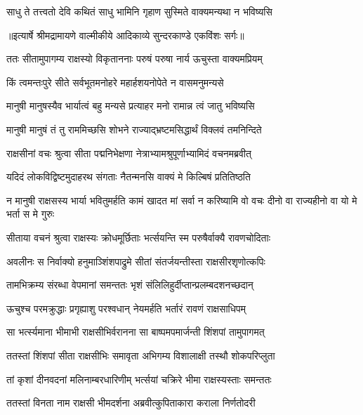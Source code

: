 \twolineshloka
{साधु ते तत्त्वतो देवि कथितं साधु भामिनि}
{गृहाण सुस्मिते वाक्यमन्यथा न भविष्यसि} %


{॥इत्यार्षे श्रीमद्रामायणे वाल्मीकीये आदिकाव्ये सुन्दरकाण्डे एकविंशः सर्गः॥}


\twolineshloka
{ततः सीतामुपागम्य राक्षस्यो विकृताननाः}
{परुषं परुषा नार्य ऊचुस्ता वाक्यमप्रियम्} %

\twolineshloka
{किं त्वमन्तःपुरे सीते सर्वभूतमनोहरे}
{महार्हशयनोपेते न वासमनुमन्यसे} %

\twolineshloka
{मानुषी मानुषस्यैव भार्यात्वं बहु मन्यसे}
{प्रत्याहर मनो रामान्न त्वं जातु भविष्यसि} %

\twolineshloka
{मानुषी मानुषं तं तु राममिच्छसि शोभने}
{राज्याद्भ्रष्टमसिद्धार्थं विक्लवं तमनिन्दिते} %

\twolineshloka
{राक्षसीनां वचः श्रुत्वा सीता पद्मनिभेक्षणा}
{नेत्राभ्यामश्रुपूर्णाभ्यामिदं वचनमब्रवीत्} %

\twolineshloka
{यदिदं लोकविद्विष्टमुदाहरथ संगताः}
{नैतन्मनसि वाक्यं मे किल्बिषं प्रतितिष्ठति} %

\threelineshloka
{न मानुषी राक्षसस्य भार्या भवितुमर्हति}
{कामं खादत मां सर्वा न करिष्यामि वो वचः}
{दीनो वा राज्यहीनो वा यो मे भर्ता स मे गुरुः} %

\twolineshloka
{सीताया वचनं श्रुत्वा राक्षस्यः क्रोधमूर्छिताः}
{भर्त्सयन्ति स्म परुषैर्वाक्यै रावणचोदिताः} %

\twolineshloka
{अवलीनः स निर्वाक्यो हनुमाञ्शिंशपाद्रुमे}
{सीतां संतर्जयन्तीस्ता राक्षसीरशृणोत्कपिः} %

\twolineshloka
{तामभिक्रम्य संरब्धा वेपमानां समन्ततः}
{भृशं संलिलिहुर्दीप्तान्प्रलम्बदशनच्छदान्} %

\twolineshloka
{ऊचुश्च परमक्रुद्धाः प्रगृह्याशु परश्वधान्}
{नेयमर्हति भर्तारं रावणं राक्षसाधिपम्} %

\twolineshloka
{सा भर्त्स्यमाना भीमाभी राक्षसीभिर्वरानना}
{सा बाष्पमपमार्जन्ती शिंशपां तामुपागमत्} %

\twolineshloka
{ततस्तां शिंशपां सीता राक्षसीभिः समावृता}
{अभिगम्य विशालाक्षी तस्थौ शोकपरिप्लुता} %

\twolineshloka
{तां कृशां दीनवदनां मलिनाम्बरधारिणीम्}
{भर्त्सयां चक्रिरे भीमा राक्षस्यस्ताः समन्ततः} %

\twolineshloka
{ततस्तां विनता नाम राक्षसी भीमदर्शना}
{अब्रवीत्कुपिताकारा कराला निर्णतोदरी} %

